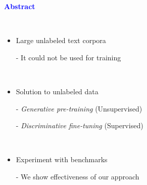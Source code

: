 \documentclass[professionalfont]{beamer}
\begin{document}
\frame{\titlepage}


\begin{frame}
\begin{center}
    { \textbf{\textcolor{blue}{ {\fontsize{12}{14}\selectfont Abstract} }} }
\end{center}
\\[0.5cm]

{\fontsize{10}{14}\selectfont 
\begin{itemize}
    \item Large unlabeled text corpora
    
    - It could not be used for training

    \\[0.5cm]

    \item Solution to unlabeled data

    - \textit{Generative pre-training} (Unsupervised)

    - \textit{Discriminative fine-tuning} (Supervised)

    \\[0.5cm]

    \item Experiment with benchmarks

    - We show effectiveness of our approach
\end{itemize}
}

\end{frame}
\end{document}

